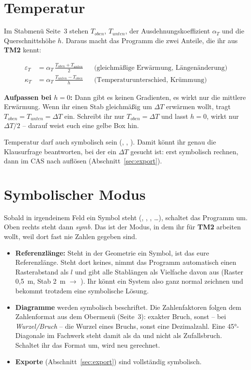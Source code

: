 \section{Temperatur}\label{sec:temperatur}

Im Stabmenü Seite~3 stehen $T_{oben}$, $T_{unten}$, der Ausdehnungskoeffizient $\alpha_T$ und die
Querschnittshöhe $h$. Daraus macht das Programm die zwei Anteile, die ihr aus \textbf{TM2} kennt:

\begin{align*}
  \varepsilon_T &= \alpha_T \,\frac{T_{oben} + T_{unten}}{2} && \text{(gleichmäßige Erwärmung, Längenänderung)}\\
  \kappa_T &= \alpha_T \,\frac{T_{unten} - T_{oben}}{h} && \text{(Temperaturunterschied, Krümmung)}
\end{align*}

\textbf{Aufpassen bei $h = 0$:} Dann gibt es keinen Gradienten, es wirkt nur die mittlere
Erwärmung. Wenn ihr einen Stab gleichmäßig um $\Delta T$ erwärmen wollt, tragt
$T_{oben} = T_{unten} = \Delta T$ ein. Schreibt ihr nur $T_{oben} = \Delta T$ und lasst $h = 0$,
wirkt nur $\Delta T/2$ -- darauf weist euch eine gelbe Box hin.

Temperatur darf auch symbolisch sein (, , ). Damit könnt ihr genau die
Klausurfrage beantworten, bei der ein $\Delta T$ gesucht ist: erst symbolisch rechnen, dann im
CAS nach  auflösen (Abschnitt~\ref{sec:export}).

\section{Symbolischer Modus}\label{sec:symbolisch}

Sobald in irgendeinem Feld ein Symbol steht (, , ,  \dots),
schaltet das Programm um. Oben rechts steht dann \emph{symb.} Das ist der Modus, in dem ihr für
\textbf{TM2} arbeiten wollt, weil dort fast nie Zahlen gegeben sind.

\begin{itemize}
  \item \textbf{Referenzlänge:} Steht in der Geometrie ein Symbol, ist das eure Referenzlänge.
        Steht dort keines, nimmt das Programm automatisch einen Rasterabstand als $l$ und gibt
        alle Stablängen als Vielfache davon aus (Raster 0,5~m, Stab 2~m $\rightarrow$ ).
        Ihr könnt ein System also ganz normal zeichnen und bekommt trotzdem eine symbolische
        Lösung.
  \item \textbf{Diagramme} werden symbolisch beschriftet. Die Zahlenfaktoren folgen dem
        Zahlenformat aus dem Obermenü (Seite~3): exakter Bruch, sonst -- bei \emph{Wurzel/Bruch}
        -- die Wurzel eines Bruchs, sonst eine Dezimalzahl. Eine 45°-Diagonale im Fachwerk steht
        damit als  da und nicht als Zufallsbruch. Schaltet ihr das Format um,
        wird neu gerechnet.
  \item \textbf{Exporte} (Abschnitt~\ref{sec:export}) sind vollständig symbolisch.
\end{itemize}

